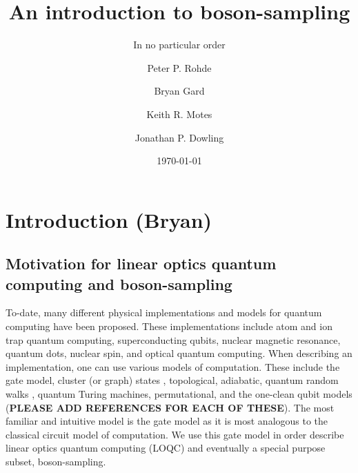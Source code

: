 \documentclass[aps,pra,twocolumn,amsmath,amssymb,nofootinbib,superscriptaddress]{revtex4}
\begin{document}


%
% 

\title{An introduction to boson-sampling}

%
%

\author{In no particular order}

\author{Peter P. Rohde}

\author{Bryan Gard}

\author{Keith R. Motes}

\author{Jonathan P. Dowling}

\date{\today}

\frenchspacing

%
%

\begin{abstract}
\end{abstract}

\maketitle

\section{Introduction (Bryan)}

\subsection{Motivation for linear optics quantum computing and boson-sampling}

To-date, many different physical implementations and models for quantum computing have been proposed. These implementations include atom and ion trap quantum computing, superconducting qubits, nuclear magnetic resonance, quantum dots, nuclear spin, and optical quantum computing. When describing an implementation, one can use various models of computation. These include the gate model, cluster (or graph) states \cite{bib:Raussendorf01, bib:Raussendorf03}, topological, adiabatic, quantum random walks \cite{bib:ADZ}, quantum Turing machines, permutational, and the one-clean qubit models (\textbf{PLEASE ADD REFERENCES FOR EACH OF THESE}). The most familiar and intuitive model is the gate model as it is most analogous to the classical circuit model of computation. We use this gate model in order describe linear optics quantum computing (LOQC) and eventually a special purpose subset, boson-sampling.
\end{document}
